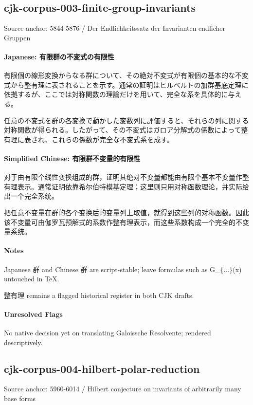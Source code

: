 \documentclass[11pt]{article}
\begin{document}
\subsection*{cjk-corpus-003-finite-group-invariants}
Source anchor: 5844-5876 / Der Endlichkeitssatz der Invarianten endlicher Gruppen
\par
\paragraph{Japanese: 有限群の不変式の有限性}
有限個の線形変換からなる群について、その絶対不変式が有限個の基本的な不変式から整有理に表されることを示す。通常の証明はヒルベルトの加群基底定理に依拠するが、ここでは対称関数の理論だけを用いて、完全な系を具体的に与える。\par
任意の不変式を群の各変換で動かした変数列に評価すると、それらの列に関する対称関数が得られる。したがって、その不変式はガロア分解式の係数によって整有理に表され、これらの係数が完全な不変式系を成す。\par
\paragraph{Simplified Chinese: 有限群不变量的有限性}
对于由有限个线性变换组成的群，证明其绝对不变量都能由有限个基本不变量作整有理表示。通常证明依靠希尔伯特模基定理；这里则只用对称函数理论，并实际给出一个完全系统。\par
把任意不变量在群的各个变换后的变量列上取值，就得到这些列的对称函数。因此该不变量可由伽罗瓦预解式的系数作整有理表示，而这些系数构成一个完全的不变量系统。\par
\paragraph{Notes}
Japanese 群 and Chinese 群 are script-stable; leave formulas such as G\_\{...\}(x) untouched in TeX.\par
整有理 remains a flagged historical register in both CJK drafts.\par
\paragraph{Unresolved Flags}
No native decision yet on translating Galoissche Resolvente; rendered descriptively.\par
\subsection*{cjk-corpus-004-hilbert-polar-reduction}
Source anchor: 5960-6014 / Hilbert conjecture on invariants of arbitrarily many base forms
\par
\end{document}
